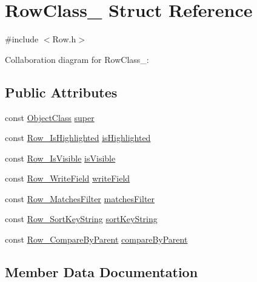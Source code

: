 \hypertarget{structRowClass__}{}\section{Row\+Class\+\_\+ Struct Reference}
\label{structRowClass__}


{\ttfamily \#include $<$Row.\+h$>$}



Collaboration diagram for Row\+Class\+\_\+\+:
\subsection*{Public Attributes}
\begin{DoxyCompactItemize}
\item 
const \hyperlink{Object_8h_a6feb151c3b8f61fae503dfbcdc3d6a54}{Object\+Class} \hyperlink{structRowClass___a30ab15f272d4a17e39fb5ffcf30e4fa3}{super}
\item 
const \hyperlink{Row_8h_aacc6c35bb344756ec17fd975b2539e03}{Row\+\_\+\+Is\+Highlighted} \hyperlink{structRowClass___a79fe411190eaa703c46ec7cf7d9994ae}{is\+Highlighted}
\item 
const \hyperlink{Row_8h_a08d2a190b74ac8186225e90c378d6cc2}{Row\+\_\+\+Is\+Visible} \hyperlink{structRowClass___a3bc16c5a9768d03458ccb3bf04736aca}{is\+Visible}
\item 
const \hyperlink{Row_8h_a89f55adea231414c3e16986d1ae5bdf0}{Row\+\_\+\+Write\+Field} \hyperlink{structRowClass___acdc5cbb4697d54a502e5da2eec0d9aa6}{write\+Field}
\item 
const \hyperlink{Row_8h_a70a6514fbcdaef7ce30f91127f13a62a}{Row\+\_\+\+Matches\+Filter} \hyperlink{structRowClass___a4bf18b4d66cfc8138c92aa174b4554cb}{matches\+Filter}
\item 
const \hyperlink{Row_8h_a5038da65a10191f16604a8a23592762d}{Row\+\_\+\+Sort\+Key\+String} \hyperlink{structRowClass___ac3f824b7c7c6987e44cc185ebe9ebf1c}{sort\+Key\+String}
\item 
const \hyperlink{Row_8h_a98170315e8c78545311121660583147f}{Row\+\_\+\+Compare\+By\+Parent} \hyperlink{structRowClass___aa085f96bfc006ab74ca158edbb276b99}{compare\+By\+Parent}
\end{DoxyCompactItemize}


\subsection{Member Data Documentation}
\mbox{\label{structRowClass___aa085f96bfc006ab74ca158edbb276b99}} 
